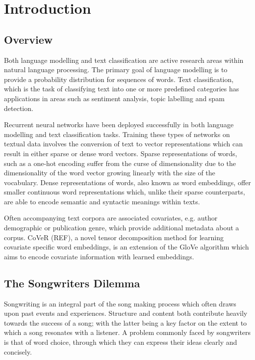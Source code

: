 \chapter{Introduction}
\label{chap:intro}
\section{Overview}
Both language modelling and text classification are active research areas within natural language processing. The primary goal of language modelling is to provide a probability distribution for sequences of words. Text classification, which is the task of classifying text into one or more predefined categories has applications in areas such as sentiment analysis, topic labelling and spam detection.   

\noindent
\newline
Recurrent neural networks have been deployed successfully in both language modelling and text classification tasks. Training these types of networks on textual data involves the conversion of text to vector representations which can result in either sparse or dense word vectors. Sparse representations of words, such as a one-hot encoding suffer from the curse of dimensionality due to the dimensionality of the word vector growing linearly with the size of the vocabulary. Dense representations of words, also known as word embeddings, offer smaller continuous word representations which, unlike their sparse counterparts, are able to encode semantic and syntactic meanings within texts.  

\noindent
\newline
Often accompanying text corpora are associated covariates, e.g. author demographic or publication genre, which provide additional metadata about a corpus. CoVeR (REF), a novel tensor decomposition method for learning covariate specific word embeddings, is an extension of the GloVe algorithm which aims to encode covariate information with learned embeddings.

\section{The Songwriters Dilemma}
Songwriting is an integral part of the song making process which often draws upon past events and experiences. Structure and content both contribute heavily towards the success of a song; with the latter being a key factor on the extent to which a song resonates with a listener. A problem commonly faced by songwriters is that of word choice, through which they can express their ideas clearly and concisely.

